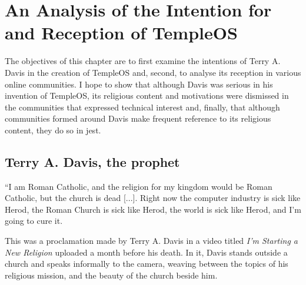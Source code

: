 \documentclass[Draft.tex]{subfiles}
\begin{document}
\chapter{An Analysis of the Intention for and Reception of TempleOS}

The objectives of this chapter are to first examine
the intentions of Terry A. Davis in the creation of TempleOS and, second,
to analyse its reception in various online communities.
I hope to show that although Davis was serious in his invention of TempleOS,
its religious content and motivations were dismissed
in the communities that expressed technical interest and, finally,
that although communities formed around Davis make frequent reference
to its religious content, they do so in jest.

\section*{Terry A. Davis, the prophet}

\begin{displayquote}
  ``I am Roman Catholic, and the religion for my kingdom
  would be Roman Catholic, but the church is dead [...].
  Right now the computer industry is sick like Herod,
  the Roman Church is sick like Herod,
  the world is sick like Herod, and I'm going to cure it.
\end{displayquote}

This was a proclamation made by Terry A. Davis \parencite*{NewReligion} in a video titled
\textit{I'm Starting a New Religion} uploaded a month before his death.
In it, Davis stands outside a church and speaks informally to the camera,
weaving between the topics of his religious mission,
and the beauty of the church beside him.


\end{document}
